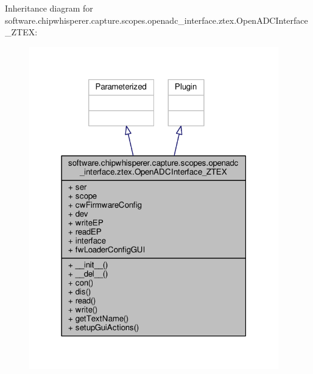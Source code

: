 Inheritance diagram for software.\+chipwhisperer.\+capture.\+scopes.\+openadc\+\_\+interface.\+ztex.\+Open\+A\+D\+C\+Interface\+\_\+\+Z\+T\+E\+X\+:\nopagebreak
\begin{figure}[H]
\begin{center}
\leavevmode
\includegraphics[width=307pt]{d5/d99/classsoftware_1_1chipwhisperer_1_1capture_1_1scopes_1_1openadc__interface_1_1ztex_1_1OpenADCInterface__ZTEX__inherit__graph}
\end{center}
\end{figure}


